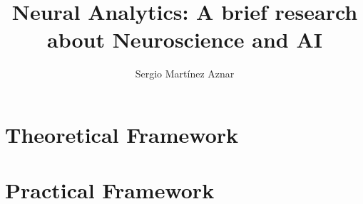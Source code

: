 \documentclass[a4paper,12pt]{book}            %
\title{Neural Analytics: A brief research about Neuroscience and AI}
\author{Sergio Martínez Aznar}
\begin{document}




\frontmatter
    
    

    
    
    

\mainmatter
    \part{Theoretical Framework}
        

    \part{Practical Framework}
        

\backmatter
    
    
\end{document}
